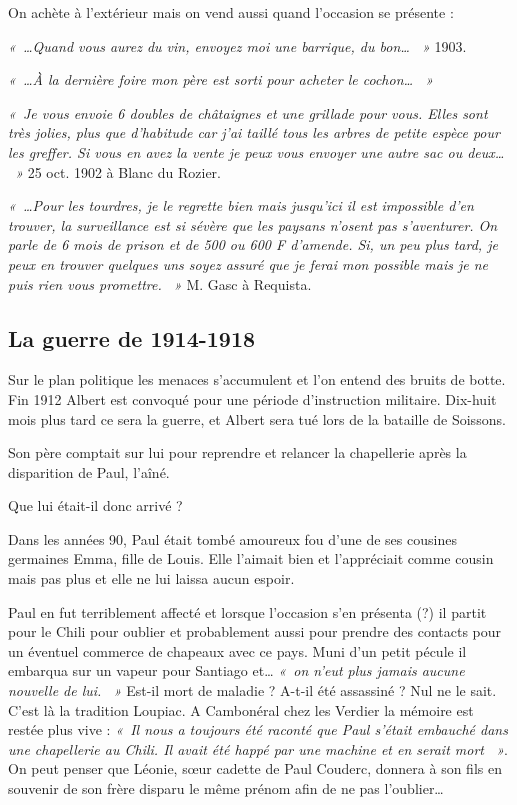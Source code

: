 On achète à l’extérieur mais on vend aussi quand l’occasion se présente :

\textit{«~…Quand vous aurez du vin, envoyez moi une barrique, du bon… ~»} 1903.

\textit{«~…À la dernière foire mon père est sorti pour acheter le cochon… ~»}

\textit{«~Je vous envoie 6 doubles de châtaignes et une grillade pour vous. Elles sont très jolies,
plus que d’habitude car j’ai taillé tous les arbres de petite espèce pour les greffer. Si vous en
avez la vente je peux vous envoyer une autre sac ou deux… ~»} 25 oct. 1902 à Blanc du Rozier.

\textit{«~…Pour les tourdres, je le regrette bien mais jusqu’ici il est impossible d’en trouver, la
surveillance est si sévère que les paysans n’osent pas s’aventurer. On parle de 6 mois de
prison et de 500 ou 600 F d’amende. Si, un peu plus tard, je peux en trouver quelques uns soyez
assuré que je ferai mon possible mais je ne puis rien vous promettre. ~»} M. Gasc à Requista.

\subsection{La guerre de 1914-1918}

Sur le plan politique les menaces s’accumulent et l’on entend des bruits de botte. Fin 1912
Albert est convoqué pour une période d’instruction militaire. Dix-huit mois plus tard ce sera la
guerre, et Albert sera tué lors de la bataille de Soissons.

Son père comptait sur lui pour reprendre et relancer la chapellerie après la disparition de Paul,
l’aîné.

Que lui était-il donc arrivé ?

Dans les années 90, Paul était tombé amoureux fou d’une de ses cousines germaines Emma,
fille de Louis. Elle l’aimait bien et l’appréciait comme cousin mais pas plus et elle ne lui
laissa aucun espoir.

Paul en fut terriblement affecté et lorsque l’occasion s’en présenta (?) il partit pour le Chili
pour oublier et probablement aussi pour prendre des contacts pour un éventuel commerce de
chapeaux avec ce pays. Muni d’un petit pécule il embarqua sur un vapeur pour Santiago et…
\textit{«~on n’eut plus jamais aucune nouvelle de lui. ~»} Est-il mort de maladie ? A-t-il été assassiné ?
Nul ne le sait. C’est là la tradition Loupiac. A Cambonéral chez les Verdier la mémoire est
restée plus vive : \textit{«~Il nous a toujours été raconté que Paul s’était embauché dans une
chapellerie au Chili. Il avait été happé par une machine et en serait mort ~»}. On peut penser
que Léonie, sœur cadette de Paul Couderc, donnera à son fils en souvenir de son frère disparu
le même prénom afin de ne pas l’oublier…

